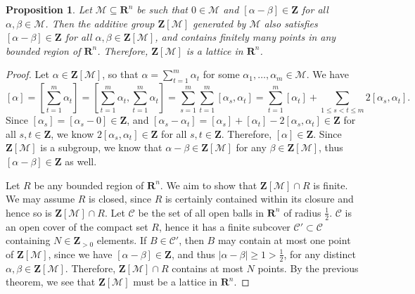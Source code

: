 \documentclass[10pt]{article}
\newcommand{\M}{\mathcal{M}}
\newcommand{\norm}[1]{\left[#1\right]}
\newcommand{\Z}{\mathbf{Z}}
\newcommand{\R}{\mathbf{R}}
\newtheorem*{prop}{Proposition}
\begin{document}
\pagebreak

\begin{prop}
\normalfont
Let $\M \subseteq \R^n$ be such that $0 \in \M$ and $\norm{\alpha - \beta} \in \Z$ for all $\alpha, \beta \in \M$.  Then the additive group $\Z[\M]$ generated by $\M$ also satisfies $\norm{\alpha - \beta} \in \Z$ for all $\alpha,\beta \in \Z[\M]$, and contains finitely many points in any bounded region of $\R^n$.  Therefore, $\Z[\M]$ is a lattice in $\R^n$.
\end{prop}

\begin{proof}
Let $\alpha \in \Z[\M]$, so that $\alpha = \sum_{t=1}^m \alpha_t$ for some $\alpha_1, \dots , \alpha_m \in \M$.  We have
$$
\norm{\alpha} = \norm{ \sum_{t=1}^m \alpha_t } = \norm{\sum_{t=1}^m \alpha_t, \sum_{t=1}^m \alpha_t} = \sum_{s=1}^m \sum_{t=1}^m \norm{\alpha_s,\alpha_t} = 
\sum_{t=1}^m \norm{\alpha_t} +
\sum_{1 \leq s < t \leq m} 2\norm{\alpha_s,\alpha_t}.
$$
Since $\norm{\alpha_s} = \norm{\alpha_s - 0} \in \Z$, and $\norm{\alpha_s - \alpha_t} = \norm{\alpha_s} + \norm{\alpha_t} - 2\norm{\alpha_s,\alpha_t} \in \Z$ for all $s,t \in \Z$, we know $2 \norm{\alpha_s,\alpha_t} \in \Z$ for all $s,t \in \Z$.  Therefore, $\norm{\alpha} \in \Z$.  Since $\Z[\M]$ is a subgroup, we know that $\alpha - \beta \in \Z[\M]$ for any $\beta \in \Z[\M]$, thus $\norm{\alpha - \beta} \in \Z$ as well.

Let $R$ be any bounded region of $\R^n$.  We aim to show that $\Z[\M] \cap R$ is finite.  We may assume $R$ is closed, since $R$ is certainly contained within its closure and hence so is $\Z[\M] \cap R$.  Let $\mathcal{C}$ be the set of all open balls in $\R^n$ of radius $\frac12$.  $\mathcal{C}$ is an open cover of the compact set $R$, hence it has a finite subcover $\mathcal{C}' \subset \mathcal{C}$ containing $N \in \Z_{>0}$ elements.  If $B \in \mathcal{C}'$, then $B$ may contain at most one point of $\Z[\M]$, since we have $\norm{\alpha - \beta} \in \Z$, and thus $|\alpha - \beta| \geq 1 > \frac12$, for any distinct $\alpha, \beta \in \Z[\M]$.  Therefore, $\Z[\M] \cap R$ contains at most $N$ points.  By the previous theorem, we see that $\Z[\M]$ must be a lattice in $\R^n$.
\end{proof}
\end{document}
